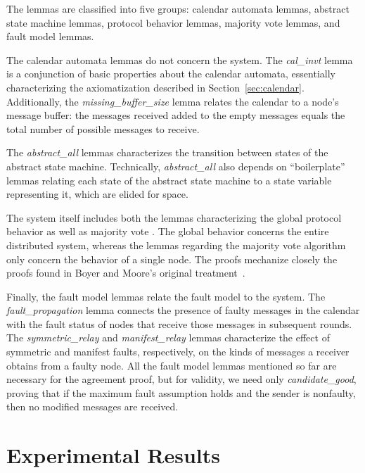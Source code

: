\documentclass{llncs/llncs}
\newcommand{\lee}[1]{ } %
\newcommand{\lee}[1]{ {\color{blue}$<$lee: #1$>$} } %
\begin{document}
The lemmas are classified into five groups: calendar automata lemmas, abstract state machine lemmas, protocol behavior lemmas, majority vote lemmas, and fault model lemmas.

The calendar automata lemmas do not concern the system. The \emph{cal\_invt} lemma is a conjunction of basic properties about the calendar automata, essentially characterizing the axiomatization described in Section~\ref{sec:calendar}. Additionally, the \emph{missing\_buffer\_size} lemma relates the calendar to a node's message buffer: the messages received added to the empty messages equals the total number of possible messages to receive.

The \emph{abstract\_all} lemmas characterizes the transition between states of the abstract state machine. Technically, \emph{abstract\_all} also depends on ``boilerplate'' lemmas relating each state of the abstract state machine to a state variable representing it, which are elided for space.

The system itself includes both the lemmas characterizing the global protocol behavior as well as majority vote\lee{have we talked about the voting algorithm earlier?}. The global behavior concerns the entire distributed system, whereas the lemmas regarding the majority vote algorithm only concern the behavior of a single node. The proofs mechanize closely the proofs found in Boyer and Moore's original treatment~\cite{}.

Finally, the fault model lemmas relate the fault model to the system. The \emph{fault\_propagation} lemma connects the presence of faulty messages in the calendar with the fault status of nodes that receive those messages in subsequent rounds. The \emph{symmetric\_relay} and \emph{manifest\_relay} lemmas characterize the effect of symmetric and manifest faults, respectively, on the kinds of messages a receiver obtains from a faulty node. All the fault model lemmas mentioned so far are necessary for the agreement proof, but for validity, we need only \emph{candidate\_good}, proving that if the maximum fault assumption holds and the sender is nonfaulty, then no modified messages are received.

\section{Experimental Results}\label{sec:experimental}

\lee{let's also check out scalability when we ``turn off'' faults. Also, how hard is it to turn them off or change the fault model? E.g., how many lines of spec need to be changed? Compare to rushby's?}
\end{document}
